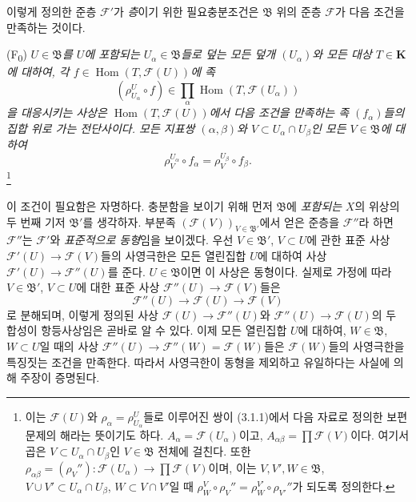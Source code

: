 \begin{env}[3.2.2]
\label{0.3.2.2-ko}
이렇게 정의한 준층 $\mathcal F'$가 \emph{층}이기 위한 필요충분조건은 $\mathfrak B$ 위의 준층 $\mathcal F$가 다음 조건을 만족하는 것이다.

\smallskip
\noindent
\textup{(F\textsubscript{0})} \emph{$U\in\mathfrak B$를 $U$에 포함되는 $U_\alpha\in\mathfrak B$들로 덮는 모든 덮개 $(U_\alpha)$와 모든 대상 $T\in\mathbf K$에 대하여, 각 $f\in\operatorname{Hom}(T,\mathcal F(U))$에 족}
\[
  (\rho_{U_\alpha}^{U}\circ f)
  \in\prod_\alpha\operatorname{Hom}(T,\mathcal F(U_\alpha))
\]
\emph{을 대응시키는 사상은 $\operatorname{Hom}(T,\mathcal F(U))$에서 다음 조건을 만족하는 족 $(f_\alpha)$들의 집합 위로 가는 전단사이다. 모든 지표쌍 $(\alpha,\beta)$와 $V\subset U_\alpha\cap U_\beta$인 모든 $V\in\mathfrak B$에 대하여}
\[
  \rho_V^{U_\alpha}\circ f_\alpha
  =\rho_V^{U_\beta}\circ f_\beta.
\]%
\footnote{이는 $\mathcal F(U)$와 $\rho_\alpha=\rho_{U_\alpha}^{U}$들로 이루어진 쌍이 (3.1.1)에서 다음 자료로 정의한 보편 문제의 해라는 뜻이기도 하다. $A_\alpha=\mathcal F(U_\alpha)$이고,
$A_{\alpha\beta}=\prod\mathcal F(V)$이다. 여기서 곱은 $V\subset U_\alpha\cap U_\beta$인 $V\in\mathfrak B$ 전체에 걸친다. 또한
$\rho_{\alpha\beta}=(\rho_V''):\mathcal F(U_\alpha)\to\prod\mathcal F(V)$이며, 이는 $V,V',W\in\mathfrak B$, $V\cup V'\subset U_\alpha\cap U_\beta$, $W\subset V\cap V'$일 때
$\rho_W^V\circ\rho_V''=\rho_W^{V'}\circ\rho_{V'}''$가 되도록 정의한다.}

이 조건이 필요함은 자명하다. 충분함을 보이기 위해 먼저 $\mathfrak B$에 \emph{포함되는} $X$의 위상의 두 번째 기저 $\mathfrak B'$를 생각하자. 부분족 $(\mathcal F(V))_{V\in\mathfrak B'}$에서 얻은 준층을 $\mathcal F''$라 하면 $\mathcal F''$는 $\mathcal F'$와 \emph{표준적으로 동형}임을 보이겠다. 우선 $V\in\mathfrak B'$, $V\subset U$에 관한 표준 사상 $\mathcal F'(U)\to\mathcal F(V)$들의 사영극한은 모든 열린집합 $U$에 대하여 사상 $\mathcal F'(U)\to\mathcal F''(U)$를 준다. $U\in\mathfrak B$이면 이 사상은 동형이다. 실제로 가정에 따라 $V\in\mathfrak B'$, $V\subset U$에 대한 표준 사상 $\mathcal F''(U)\to\mathcal F(V)$들은
\[
  \mathcal F''(U)\longrightarrow\mathcal F(U)
  \longrightarrow\mathcal F(V)
\]
로 분해되며, 이렇게 정의된 사상 $\mathcal F(U)\to\mathcal F''(U)$와 $\mathcal F''(U)\to\mathcal F(U)$의 두 합성이 항등사상임은 곧바로 알 수 있다. 이제 모든 열린집합 $U$에 대하여, $W\in\mathfrak B$, $W\subset U$일 때의 사상 $\mathcal F''(U)\to\mathcal F''(W)=\mathcal F(W)$들은 $\mathcal F(W)$들의 사영극한을 특징짓는 조건을 만족한다. 따라서 사영극한이 동형을 제외하고 유일하다는 사실에 의해 주장이 증명된다.


\end{env}
